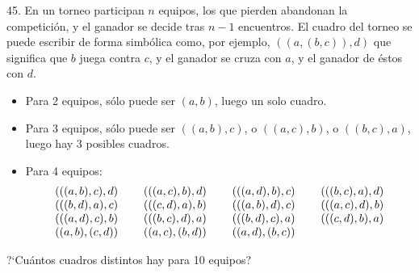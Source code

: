 \begin{problem}{45.}
	En un torneo participan $n$ equipos, los que pierden abandonan la competici\'on, y el ganador se decide tras $n-1$ encuentros.
	El cuadro del torneo se puede escribir de forma simb\'olica como, por ejemplo,  $((a,(b,c)),d)$ que significa que $b$ juega contra
$c$, y el ganador se cruza con $a$, y el ganador de \'estos con $d$.
	\begin{itemize}
		\item Para 2 equipos, s\'olo puede ser $(a,b)$, luego un solo cuadro.
		\item Para 3 equipos, s\'olo puede ser $((a,b),c)$, o $((a,c),b)$, o $((b,c),a)$, luego hay 3 posibles cuadros.
		\item Para 4 equipos:
			\begin{equation*}
				\begin{array}{@{}cccc@{}}
					(((a,b),c),d) & \quad\;(((a,c),b),d) & \quad\;(((a,d),b),c) & \quad\;(((b,c),a),d) \\
					(((b,d),a),c) & \quad\;(((c,d),a),b) & \quad\;(((a,b),d),c) & \quad\;(((a,c),d),b) \\ 
					(((a,d),c),b) & \quad\;(((b,c),d),a) & \quad\;(((b,d),c),a) & \quad\;(((c,d),b),a) \\
					((a,b),(c,d)) & \quad\;((a,c),(b,d)) & \quad\;((a,d),(b,c))
				\end{array}
			\end{equation*}
	\end{itemize}
	?`Cu\'antos cuadros distintos hay para 10 equipos? 
\end{problem}

